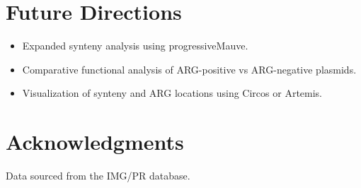 \documentclass[a4paper,12pt]{report}
\begin{document}
	\section*{Future Directions}
	\begin{itemize}
		\item Expanded synteny analysis using progressiveMauve.
		\item Comparative functional analysis of ARG-positive vs ARG-negative plasmids.
		\item Visualization of synteny and ARG locations using Circos or Artemis.
	\end{itemize}
	
	\section*{Acknowledgments}
	Data sourced from the IMG/PR database.
	
\end{document}
